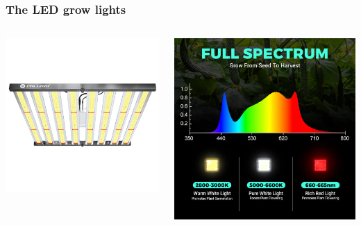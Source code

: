 \documentclass[
    12pt,
    aspectratio=1610,
    b,
    bibliography=../bibliography.bib,
    link-citations]{beamer}
\begin{document}
    \begin{frame}
        \frametitle{The LED grow lights}
        \begin{columns}[T]
            \begin{column}{.45\textwidth}
                \includegraphics[width=\linewidth]{PHLIZON_PH-FD8-E}
            \end{column}
            \begin{column}{.45\textwidth}
                \includegraphics[width=\linewidth]{PHLIZON_PH-FD8-E_light-spectrum}
            \end{column}
        \end{columns}
    \end{frame}
\end{document}
